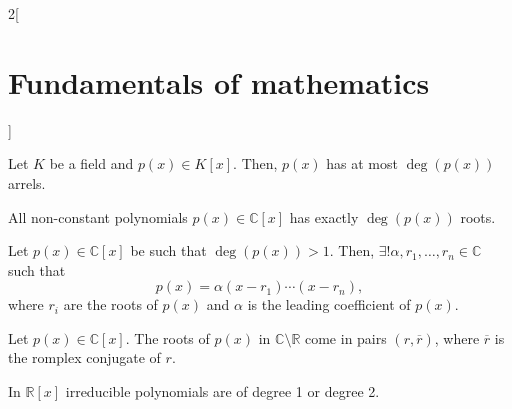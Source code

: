 \documentclass[../../../main.tex]{subfiles}
\begin{document}
\begin{multicols}{2}[\section{Fundamentals of mathematics}]
\begin{theorem}
        Let $K$ be a field and $p(x)\in K[x]$. Then, $p(x)$ has at most $\deg(p(x))$ arrels.
    \end{theorem}
    \begin{theorem}
        All non-constant polynomials $p(x)\in\mathbb{C}[x]$ has exactly $\deg(p(x))$ roots.
    \end{theorem}
    \begin{corollary}
        Let $p(x)\in\mathbb{C}[x]$ be such that $\deg(p(x))>1$. Then, $\exists!\alpha,r_1,\ldots,r_n\in\mathbb{C}$ such that $$p(x)=\alpha(x-r_1)\cdots(x-r_n),$$ where $r_i$ are the roots of $p(x)$ and $\alpha$ is the leading coefficient of $p(x)$.
    \end{corollary}
    \begin{corollary}
        Let $p(x)\in\mathbb{C}[x]$. The roots of $p(x)$ in $\mathbb{C}\setminus\mathbb{R}$ come in pairs $(r,\overline{r})$, where $\overline{r}$ is the romplex conjugate of $r$.
    \end{corollary}
    \begin{theorem}
        In $\mathbb{R}[x]$ irreducible polynomials are of degree 1 or degree 2.
    \end{theorem}
\end{multicols}
\end{document}
